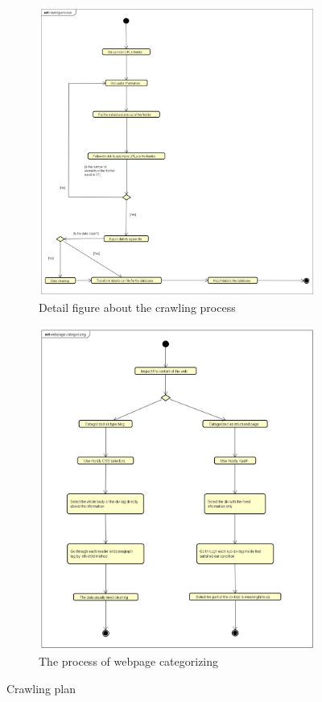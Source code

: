\documentclass[11pt,a4paper]{report}
\begin{document}
\begin{figure}[h!]
  \centering
  \begin{subfigure}[b]{0.4\linewidth}
    \includegraphics[width=\linewidth]{crawling-process.png}
    \caption{Detail figure about the crawling process}
  \end{subfigure}
  \begin{subfigure}[b]{0.4\linewidth}
    \includegraphics[width=\linewidth]{webpage-categorizing.png}
    \caption{The process of webpage categorizing}
  \end{subfigure}
  \caption{Crawling plan}
  \label{fig:cp}
\end{figure}
\end{document}
